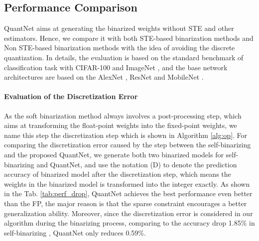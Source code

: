 \documentclass[runningheads]{llncs}
\begin{document}
\subsection{Performance Comparison}
QuantNet aims at generating the binarized weights without STE and other estimators.
Hence, we compare it with both STE-based binarization
methods \cite{courbariaux2015binaryconnect,Zhou2016DoReFa,hou2016loss,Zhang2018LQ,jung2019learning}
and Non STE-based binarization
methods \cite{bai2019prox,chen2019meta,Uhlich2019DQ,lahoud2019self}
with the idea of avoiding the discrete quantization.
In details, the evaluation is based on the standard benchmark of classification task
with CIFAR-100 \cite{cifar10} and ImageNet \cite{Deng2009},
and the base network architectures are based on the
AlexNet \cite{Krizhevsky2012}, ResNet \cite{he2016deep} and MobileNet \cite{sandler2018mobilenetv2}.

\paragraph{\textbf{Evaluation of the Discretization Error}}
As the soft binarization method \cite{lahoud2019self} always involves a post-processing step,
which aims at transforming the float-point weights into the fixed-point weights,
we name this step the discretization step which is shown in Algorithm \ref{alg:op}.
For comparing the discretization error caused by the step
between the self-binarizing \cite{lahoud2019self} and the proposed QuantNet,
we generate both two binarized models for self-binarizing and QuantNet,
and use the notation (D) to denote the prediction accuracy of binarized model after the discretization step,
which means the weights in the binarized model is transformed into the integer exactly.
As shown in the Tab. \ref{tab:perf_drop}, QuantNet achieves the best performance even better than the FP,
the major reason is that the sparse constraint encourages a better generalization ability.
Moreover, since the discretization error is considered in our algorithm during the binarizing process,
comparing to the accuracy drop 1.85\% in self-binarizing \cite{lahoud2019self},
QuantNet only reduces 0.59\%.
\end{document}
